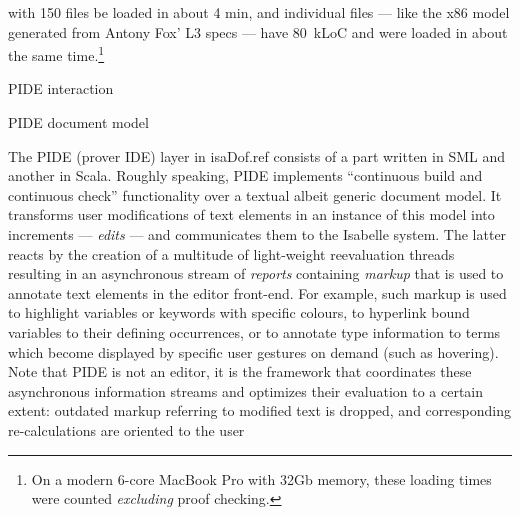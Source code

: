\begin{isabellebody}
\begin{isamarkuptext}
with 150 files be loaded in about 4 min, and individual files
--- like the x86 model generated from Antony Fox' L3 specs --- have 80~kLoC and were loaded in 
about the same time.\footnote{On a modern 6-core MacBook Pro with 32Gb memory,
these loading times were counted \emph{excluding} proof checking.}%
\end{isamarkuptext}\isamarkuptrue%
%
\begin{isamarkupfigure*}%
[label = {docmodel1},type = {Isa_COL.figure}, args={label = {docmodel1},type = {Isa_COL.figure}, Isa_COL.figure.relative_width = {20}, Isa_COL.figure.src = {figures/document-model1}, Isa_COL.figure.spawn_columns = {True}}]PIDE interaction%
\end{isamarkupfigure*}\isamarkuptrue%
%
\begin{isamarkupfigure*}%
[label = {docmodel2},type = {Isa_COL.figure}, args={label = {docmodel2},type = {Isa_COL.figure}, Isa_COL.figure.relative_width = {24}, Isa_COL.figure.src = {figures/document-model2}, Isa_COL.figure.spawn_columns = {True}}]PIDE document model%
\end{isamarkupfigure*}\isamarkuptrue%
%
\begin{isamarkuptext}%
The PIDE (prover IDE) layer in \csname isaDof.ref consists of a part written in SML
and another in Scala. Roughly speaking, PIDE implements ``continuous build and continuous check''
functionality over a textual albeit generic document model. It transforms user modifications of text
elements in an instance of this model into increments --- \emph{edits} --- and
communicates them to the Isabelle system. The latter reacts by the creation of a multitude of
light-weight reevaluation threads resulting in an asynchronous stream of
\emph{reports} containing \emph{markup} that is used to annotate
text elements in the editor front-end. For example, such markup is used to highlight variables or
keywords with specific colours, to hyperlink bound variables to their defining occurrences, or to
annotate type information to terms which become displayed by specific user gestures on demand (such
as hovering). Note that PIDE is not an editor, it is the framework that coordinates these
asynchronous information streams and optimizes their evaluation to a certain extent: outdated markup
referring to modified text is dropped, and corresponding re-calculations are oriented to the user

\end{isamarkuptext}
\end{isabellebody}
